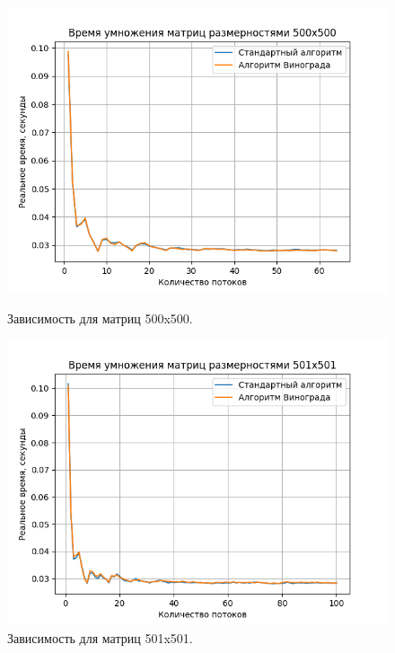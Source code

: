 \documentclass[a4paper,12pt]{article}
\begin{document}
\begin{figure}[H]
\begin{center}
\begin{minipage}[H]{0.48\linewidth}
\includegraphics[width=1\linewidth]{500x500.png}
\caption{Зависимость для матриц 500x500.}
\label{ris:experimoriginal}
\end{minipage}
\hfill
\begin{minipage}[H]{0.48\linewidth}
\includegraphics[width=1\linewidth]{501x501.png}
\caption{Зависимость для матриц 501x501.}
\label{ris:experimcoded}
\end{minipage}
\end{center}
\begin{center}
\begin{minipage}[H]{0.48\linewidth}

\end{minipage}
\end{center}
\end{figure}
\end{document}
